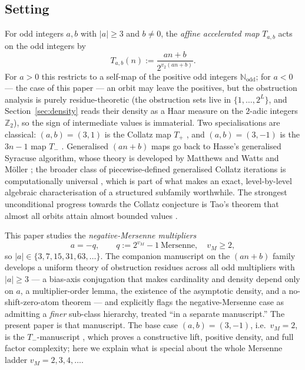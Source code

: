 \documentclass[11pt,reqno]{amsart}
\theoremstyle{plain}
\theoremstyle{definition}
\theoremstyle{remark}
\newcommand{\Tab}{T_{a,b}}
\newcommand{\Tneg}{T_{-}}
\newcommand{\Tpos}{T_{+}}
\newcommand{\N}{\mathbb{N}}
\newcommand{\Ztwo}{\mathbb{Z}_{2}}
\newcommand{\Nodd}{\N_{\mathrm{odd}}}
\newcommand{\vtwo}{v_{2}}
\newcommand{\vM}{v_{M}}
\begin{document}
\subsection{Setting}

For odd integers $a, b$ with $\lvert a \rvert \ge 3$ and $b \ne 0$, the
\emph{affine accelerated map} $\Tab$ acts on the odd integers by
\[
\Tab(n) := \frac{an + b}{2^{\vtwo(an + b)}}.
\]
For $a > 0$ this restricts to a self-map of the positive odd integers
$\Nodd$; for $a < 0$ --- the case of this paper --- an orbit may leave the
positives, but the obstruction analysis is purely residue-theoretic (the
obstruction sets live in $\{1, \ldots, 2^L\}$, and Section~\ref{sec:density}
reads their density as a Haar measure on the $2$-adic integers
$\Ztwo$), so the sign of intermediate values is immaterial.
Two specialisations are classical: $(a,b) = (3,1)$ is the Collatz map
$\Tpos$ \cite{Lagarias2010,Lagarias2010bib}, and $(a,b) = (3,-1)$ is the
$3n-1$ map $\Tneg$ \cite{Lagarias2010bib}. Generalised $(an+b)$ maps go back
to Hasse's generalised Syracuse algorithm, whose theory is developed by
Matthews and Watts \cite{MatthewsWatts1984} and M\"oller \cite{Moeller1978};
the broader class of piecewise-defined generalised Collatz iterations is
computationally universal \cite{Conway1972}, which is part of what makes an
exact, level-by-level algebraic characterisation of a structured subfamily
worthwhile. The strongest unconditional progress towards the Collatz
conjecture is Tao's theorem that almost all orbits attain almost bounded
values \cite{Tao2022}.

This paper studies the \emph{negative-Mersenne multipliers}
\[
a = -q, \qquad q := 2^{\vM} - 1 \ \text{Mersenne}, \quad \vM \ge 2,
\]
so $\lvert a \rvert \in \{3, 7, 15, 31, 63, \ldots\}$. The companion
manuscript on the $(an+b)$ family \cite{ObstructionResiduesFamily2026}
develops a uniform theory of obstruction residues across all odd multipliers
with $\lvert a \rvert \ge 3$ --- a bias-axis conjugation that makes
cardinality and density depend only on $a$, a multiplier-order lemma, the
existence of the asymptotic density, and a no-shift-zero-atom theorem --- and
explicitly flags the negative-Mersenne case as admitting a \emph{finer}
sub-class hierarchy, treated ``in a separate manuscript.'' The present paper
is that manuscript. The base case $(a,b) = (3,-1)$, i.e.\ $\vM = 2$, is the
$\Tneg$-manuscript \cite{ObstructionResidues2026}, which proves a constructive
lift, positive density, and full factor complexity; here we explain what is
special about the whole Mersenne ladder $\vM = 2, 3, 4, \ldots$.
\end{document}
